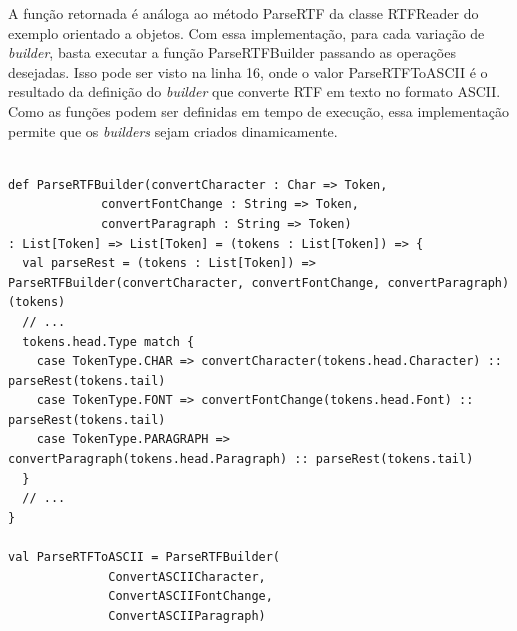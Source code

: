 A função retornada é análoga ao método 
ParseRTF da classe RTFReader do exemplo 
orientado a objetos. Com essa implementação, 
para cada variação de \textit{builder}, 
basta executar a função 
ParseRTFBuilder passando as operações 
desejadas. Isso pode ser visto na linha 16, 
onde o valor ParseRTFToASCII é o resultado 
da definição do \textit{builder} que converte 
RTF em texto no formato ASCII. Como as funções 
podem ser definidas em tempo de execução, essa 
implementação permite que os \textit{builders} 
sejam criados dinamicamente.

\begin{lstlisting}[caption={Builder Funcional.},label=fpbuilder]
    
def ParseRTFBuilder(convertCharacter : Char => Token,
             convertFontChange : String => Token,
             convertParagraph : String => Token)
: List[Token] => List[Token] = (tokens : List[Token]) => {
  val parseRest = (tokens : List[Token]) => ParseRTFBuilder(convertCharacter, convertFontChange, convertParagraph)(tokens)
  // ...
  tokens.head.Type match {
    case TokenType.CHAR => convertCharacter(tokens.head.Character) :: parseRest(tokens.tail)
    case TokenType.FONT => convertFontChange(tokens.head.Font) :: parseRest(tokens.tail)
    case TokenType.PARAGRAPH => convertParagraph(tokens.head.Paragraph) :: parseRest(tokens.tail)
  }
  // ...
}

val ParseRTFToASCII = ParseRTFBuilder(
              ConvertASCIICharacter,
              ConvertASCIIFontChange,
              ConvertASCIIParagraph)
    
\end{lstlisting}